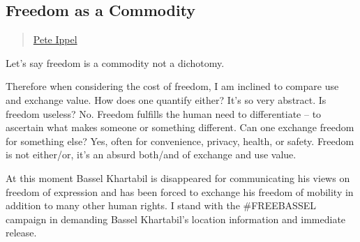 \subsection{Freedom as a Commodity}\label{freedom-as-a-commodity}

\begin{quote}
\href{../appendix/attributions.html\#pete-ippel}{Pete Ippel}
\end{quote}

Let's say freedom is a commodity not a dichotomy.

Therefore when considering the cost of freedom, I am inclined to compare
use and exchange value. How does one quantify either? It's so very
abstract. Is freedom useless? No. Freedom fulfills the human need to
differentiate -- to ascertain what makes someone or something different.
Can one exchange freedom for something else? Yes, often for convenience,
privacy, health, or safety. Freedom is not either/or, it's an absurd
both/and of exchange and use value.

At this moment Bassel Khartabil is disappeared for communicating his
views on freedom of expression and has been forced to exchange his
freedom of mobility in addition to many other human rights. I stand with
the \#FREEBASSEL campaign in demanding Bassel Khartabil's location
information and immediate release.

